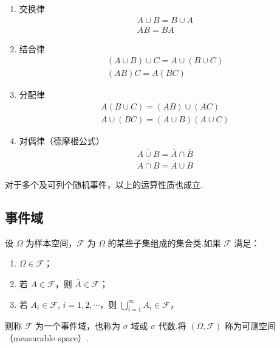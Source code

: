 \begin{property}
    \begin{enumerate}
        \item 交换律
        $$
        \begin{gathered}
            A \cup B = B \cup A \\
            AB=BA
        \end{gathered}
        $$
        \item 结合律
        $$
        \begin{gathered}
            (A \cup B) \cup C = A \cup (B \cup C) \\
            (AB)C=A(BC)
        \end{gathered}
        $$
        \item 分配律
        $$
        \begin{gathered}
            A(B \cup C) = (AB) \cup (AC) \\
            A \cup (BC) = (A \cup B)(A \cup C)
        \end{gathered}
        $$
        \item 对偶律（德摩根公式）
        $$
        \begin{gathered}
            \overline{A \cup B} = \overline{A} \cap \overline{B} \\
            \overline{A \cap B} = \overline{A} \cup \overline{B}
        \end{gathered}
        $$
    \end{enumerate}
\end{property}

对于多个及可列个随机事件，以上的运算性质也成立.

\subsection{事件域}

\begin{definition}
    \indent 设 $\varOmega$ 为样本空间，$\mathcal{F}$ 为 $\varOmega$ 的某些子集组成的集合类.如果 $\mathcal{F}$ 满足：
    \begin{enumerate}
        \item $\varOmega \in \mathcal{F}$；
        \item 若 $A \in \mathcal{F}$，则 $\overline{A} \in \mathcal{F}$；
        \item 若 $A_i \in \mathcal{F}, \, i=1,2,\cdots$，则 $\displaystyle\bigcup_{i=1}^\infty A_i \in \mathcal{F}$，
    \end{enumerate}
    则称 $\mathcal{F}$ 为一个{\heiti 事件域}，也称为 $\sigma$ {\heiti 域}或 $\sigma$ {\heiti 代数}.将 $(\varOmega, \mathcal{F})$ 称为{\heiti 可测空间}（measurable space）.
\end{definition}

